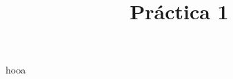 \documentclass[12pt,letterpaper]{report}
\begin{document}
	\title{Práctica 1}
	\centering
	hooa
\end{document}
